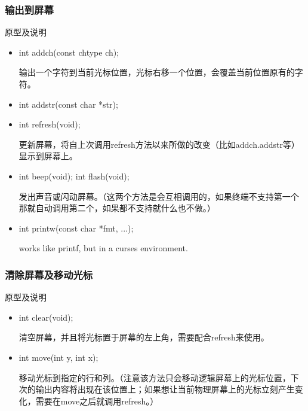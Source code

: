 \documentclass{beamer}
\begin{document}
\begin{frame}
\frametitle{输出到屏幕}
\begin{block}{原型及说明}
\begin{itemize}
\item
int addch(const chtype ch);

输出一个字符到当前光标位置，光标右移一个位置，会覆盖当前位置原有的字符。
\item
int addstr(const char *str);
\item
int refresh(void);

更新屏幕，将自上次调用refresh方法以来所做的改变（比如addch.addstr等）显示到屏幕上。
\item
int beep(void);
int flash(void);

发出声音或闪动屏幕。（这两个方法是会互相调用的，如果终端不支持第一个那就自动调用第二个，如果都不支持就什么也不做。）
\item
int printw(const char *fmt, ...);

works like printf, but in a curses environment.
\end{itemize}
\end{block}

\end{frame}





\begin{frame}
\frametitle{清除屏幕及移动光标}
\begin{block}{原型及说明}
\begin{itemize}
\item
int clear(void);

清空屏幕，并且将光标置于屏幕的左上角，需要配合refresh来使用。
\item
int move(int y, int x);

移动光标到指定的行和列。（注意该方法只会移动逻辑屏幕上的光标位置，下次的输出内容将出现在该位置上；如果想让当前物理屏幕上的光标立刻产生变化，需要在move之后就调用refresh。）
\end{itemize}
\end{block}

\end{frame}
\end{document}
